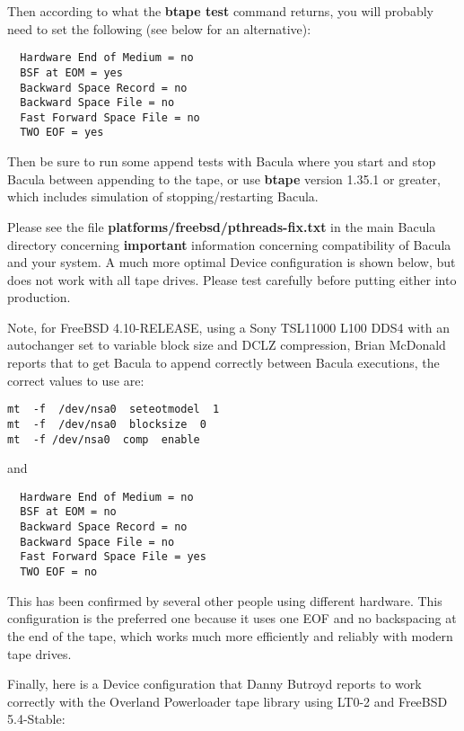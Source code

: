 Then according to what the {\bf btape test} command returns, you will probably
need to set the following (see below for an alternative): 

\footnotesize
\begin{verbatim}
  Hardware End of Medium = no
  BSF at EOM = yes
  Backward Space Record = no
  Backward Space File = no
  Fast Forward Space File = no
  TWO EOF = yes
\end{verbatim}
\normalsize

Then be sure to run some append tests with Bacula where you start and stop
Bacula between appending to the tape, or use {\bf btape} version 1.35.1 or
greater, which includes simulation of stopping/restarting Bacula. 

Please see the file {\bf platforms/freebsd/pthreads-fix.txt} in the main
Bacula directory concerning {\bf important} information concerning
compatibility of Bacula and your system. A much more optimal Device
configuration is shown below, but does not work with all tape drives. Please
test carefully before putting either into production. 

Note, for FreeBSD 4.10-RELEASE, using a Sony TSL11000 L100 DDS4 with an
autochanger set to variable block size and DCLZ compression, Brian McDonald
reports that to get Bacula to append correctly between Bacula executions,
the correct values to use are:

\footnotesize
\begin{verbatim}
mt  -f  /dev/nsa0  seteotmodel  1
mt  -f  /dev/nsa0  blocksize  0
mt  -f /dev/nsa0  comp  enable
\end{verbatim}
\normalsize

and 

\footnotesize
\begin{verbatim}
  Hardware End of Medium = no
  BSF at EOM = no
  Backward Space Record = no
  Backward Space File = no
  Fast Forward Space File = yes
  TWO EOF = no
\end{verbatim}
\normalsize

This has been confirmed by several other people using different hardware. This
configuration is the preferred one because it uses one EOF and no backspacing
at the end of the tape, which works much more efficiently and reliably with
modern tape drives. 

Finally, here is a Device configuration that Danny Butroyd reports to work
correctly with the Overland Powerloader tape library using LT0-2 and
FreeBSD 5.4-Stable:

